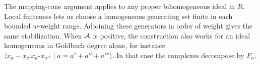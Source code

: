 \begin{remark}
The mapping-cone argument applies to any proper bihomogeneous ideal
in $R$. Local finiteness lets us choose a homogeneous generating set
finite in each bounded $w$-weight range. Adjoining these generators in
order of weight gives the same stabilization. When $\mathcal A$ is positive,
the construction also works for an ideal homogeneous in Goldbach degree
alone, for instance
$\langle x_a-x_{a'}x_{a''}x_{a'''}\mid a=a'+a''+a'''\rangle$.
In that case the complexes decompose by $F_n$.
\end{remark}


